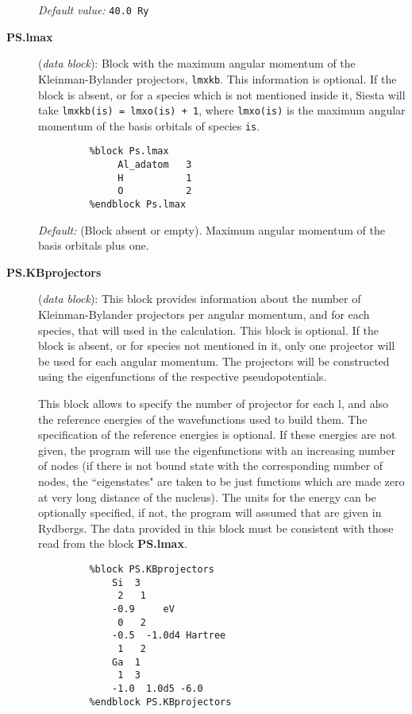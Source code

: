 \documentclass[11pt]{article}
\begin{document}
\begin{description}
{\it Default value:} {\tt 40.0 Ry}


\item[{\bf PS.lmax}]  ({\it data block}): 
Block with the maximum angular momentum of the Kleinman-Bylander 
projectors, {\tt lmxkb}. 
This information is optional. If the block 
is absent, or for a species which is not mentioned inside 
it, {\sc Siesta} will take {\tt lmxkb(is) = lmxo(is) + 1}, where {\tt lmxo(is)}
is the maximum angular momentum of the basis orbitals of species {\tt is}.
\begin{verbatim}
         %block Ps.lmax
              Al_adatom   3
              H           1
              O           2
         %endblock Ps.lmax
\end{verbatim}
{\it Default:} (Block absent or empty). Maximum angular momentum 
of the basis orbitals plus one.
\noindent

\item[{\bf PS.KBprojectors}] ({\it data block}):
This block provides information about the number of Kleinman-Bylander
projectors per angular momentum, and for each species, that will used
in the calculation. This block is optional.
If the block is absent, or for species not mentioned in it, only 
one projector will be used for each angular momentum. The projectors
will be constructed using the eigenfunctions of the respective
pseudopotentials. 


This block allows to specify the number of projector for each l, and also
the reference energies of the wavefunctions used to build them.
The specification of the reference energies is optional. If these 
energies are not given, the program will use the eigenfunctions with an
increasing number of nodes (if there is not bound state with
the corresponding number of nodes, the ``eigenstates" are taken to be just
functions which are made zero at very long distance of the nucleus).
The units for the energy can be optionally specified, if not, the 
program will assumed that are given in Rydbergs. 
The data provided in this block must be consistent with those 
read from the block {\bf PS.lmax}. 

\begin{verbatim}
         %block PS.KBprojectors
             Si  3
              2   1 
             -0.9     eV
              0   2
             -0.5  -1.0d4 Hartree
              1   2
             Ga  1
              1  3
             -1.0  1.0d5 -6.0
         %endblock PS.KBprojectors
\end{verbatim}


\end{description}
\end{document}
